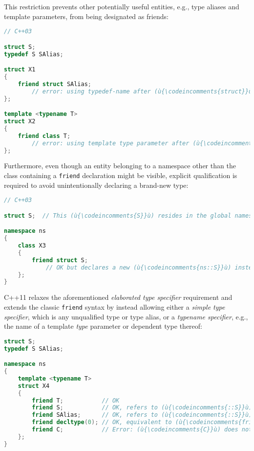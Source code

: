 \noindent This restriction prevents other potentially useful entities, e.g., type
aliases and template parameters, from being designated as friends:

\begin{lstlisting}[language=C++]
// C++03

struct S;
typedef S SAlias;

struct X1
{
    friend struct SAlias;
        // error: using typedef-name after (ù{\codeincomments{struct}}ù)
};

template <typename T>
struct X2
{
    friend class T;
        // error: using template type parameter after (ù{\codeincomments{class}}ù)
};
\end{lstlisting}

\noindent Furthermore, even though an entity belonging to a namespace other than
the class containing a \texttt{friend} declaration might be visible,
explicit qualification is required to avoid unintentionally declaring a
brand-new type:

\begin{lstlisting}[language=C++]
// C++03

struct S;  // This (ù{\codeincomments{S}}ù) resides in the global namespace.

namespace ns
{
    class X3
    {
        friend struct S;
            // OK but declares a new (ù{\codeincomments{ns::S}}ù) instead of referring to (ù{\codeincomments{::S}}ù)
    };
}
\end{lstlisting}

\noindent C++11 relaxes the aforementioned \emph{elaborated type specifier}
requirement and extends the classic \texttt{friend} syntax by instead
allowing either a \emph{simple type specifier}, which is any unqualified
type or type alias, or a \emph{typename specifier}, e.g., the name of a
template \emph{type} parameter or dependent type thereof:

\begin{lstlisting}[language=C++]
struct S;
typedef S SAlias;

namespace ns
{
    template <typename T>
    struct X4
    {
        friend T;           // OK
        friend S;           // OK, refers to (ù{\codeincomments{::S}}ù)
        friend SAlias;      // OK, refers to (ù{\codeincomments{::S}}ù)
        friend decltype(0); // OK, equivalent to (ù{\codeincomments{friend int;}}ù)
        friend C;           // Error: (ù{\codeincomments{C}}ù) does not name a type.
    };
}
\end{lstlisting}

